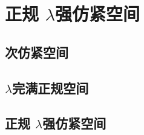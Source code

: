 \documentclass[main.tex]{subfiles}
\begin{document}
	
	
\chapter{正规	$\lambda$强仿紧空间}\label{ch11}
	
	\section{次仿紧空间}\label{sec:4.1}
	
	
	\section{$\lambda$完满正规空间}\label{sec:4.2}
	
	
	\section{正规	$\lambda$强仿紧空间}\label{sec:4.3}
	
\end{document}
